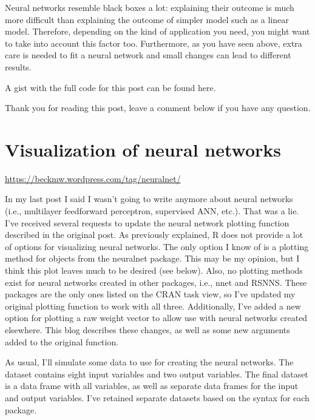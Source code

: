 \documentclass[]{book}
\begin{document}
Neural networks resemble black boxes a lot: explaining their outcome is much more difficult than explaining the outcome of simpler model such as a linear model. Therefore, depending on the kind of application you need, you might want to take into account this factor too. Furthermore, as you have seen above, extra care is needed to fit a neural network and small changes can lead to different results.

A gist with the full code for this post can be found here.

Thank you for reading this post, leave a comment below if you have any question.

\hypertarget{visualization-of-neural-networks}{%
\chapter{Visualization of neural networks}\label{visualization-of-neural-networks}}

\url{https://beckmw.wordpress.com/tag/neuralnet/}

In my last post I said I wasn't going to write anymore about neural networks (i.e., multilayer feedforward perceptron, supervised ANN, etc.). That was a lie. I've received several requests to update the neural network plotting function described in the original post. As previously explained, R does not provide a lot of options for visualizing neural networks. The only option I know of is a plotting method for objects from the neuralnet package. This may be my opinion, but I think this plot leaves much to be desired (see below). Also, no plotting methods exist for neural networks created in other packages, i.e., nnet and RSNNS. These packages are the only ones listed on the CRAN task view, so I've updated my original plotting function to work with all three. Additionally, I've added a new option for plotting a raw weight vector to allow use with neural networks created elsewhere. This blog describes these changes, as well as some new arguments added to the original function.

As usual, I'll simulate some data to use for creating the neural networks. The dataset contains eight input variables and two output variables. The final dataset is a data frame with all variables, as well as separate data frames for the input and output variables. I've retained separate datasets based on the syntax for each package.
\end{document}
